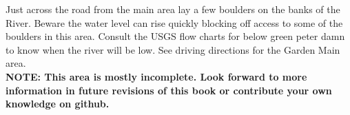 

\raggedcolumns
\begin{multicols}{2}
Just across the road from the main area lay a few boulders on the banks of the River. Beware the water level can rise quickly blocking off access to some of the boulders in this area. Consult the USGS flow charts for below green peter damn to know when the river will be low. See driving directions for the Garden Main area.\\

\textbf{NOTE: This area is mostly incomplete. Look forward to more information in future revisions of this book or contribute your own knowledge on github.}\\

\newpage
	
	
\end{multicols}
\clearpage